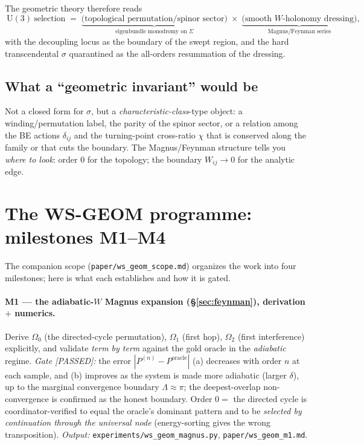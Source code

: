 \documentclass[11pt]{article}
\newcommand{\U}{\mathrm{U}}
\begin{document}
\noindent The geometric theory therefore reads
\begin{equation}
\boxed{\ \U(3)\ \text{selection}\;=\;
\underbrace{\big(\text{topological permutation/spinor sector}\big)}_{\text{eigenbundle monodromy on }\Sigma}
\;\times\;
\underbrace{\big(\text{smooth }W\text{-holonomy dressing}\big)}_{\text{Magnus/Feynman series}},\ }
\end{equation}
with the decoupling locus as the boundary of the swept region, and the hard transcendental $\sigma$
quarantined as the all-orders resummation of the dressing.

\subsection{What a ``geometric invariant'' would be}
Not a closed form for $\sigma$, but a \emph{characteristic-class}-type object: a winding/permutation label,
the parity of the spinor sector, or a relation among the BE actions $\delta_{ij}$ and the turning-point
cross-ratio $\chi$ that is conserved along the family or that cuts the boundary. The Magnus/Feynman
structure tells you \emph{where to look}: order $0$ for the topology; the boundary $W_{ij}\to0$ for the
analytic edge.

\section{The WS-GEOM programme: milestones M1--M4}\label{sec:milestones}
The companion scope (\texttt{paper/ws\_geom\_scope.md}) organizes the work into four milestones; here is
what each establishes and how it is gated.

\paragraph{M1 --- the adiabatic-$W$ Magnus expansion (\S\ref{sec:feynman}), derivation $+$ numerics.}
Derive $\Omega_0$ (the directed-cycle permutation), $\Omega_1$ (first hop), $\Omega_2$ (first interference)
explicitly, and validate \emph{term by term} against the gold oracle in the \emph{adiabatic} regime.
\emph{Gate [PASSED]:} the error $|P^{(n)}-P^{\mathrm{oracle}}|$ (a) decreases with order $n$ at each
sample, and (b) improves as the system is made more adiabatic (larger $\delta$), up to the marginal
convergence boundary $\Lambda\!\approx\!\pi$; the deepest-overlap non-convergence is confirmed as the honest
boundary. Order $0=$ the directed cycle is coordinator-verified to equal the oracle's dominant pattern and
to be \emph{selected by continuation through the universal node} (energy-sorting gives the wrong
transposition). \emph{Output:} \texttt{experiments/ws\_geom\_magnus.py}, \texttt{paper/ws\_geom\_m1.md}.
\end{document}
